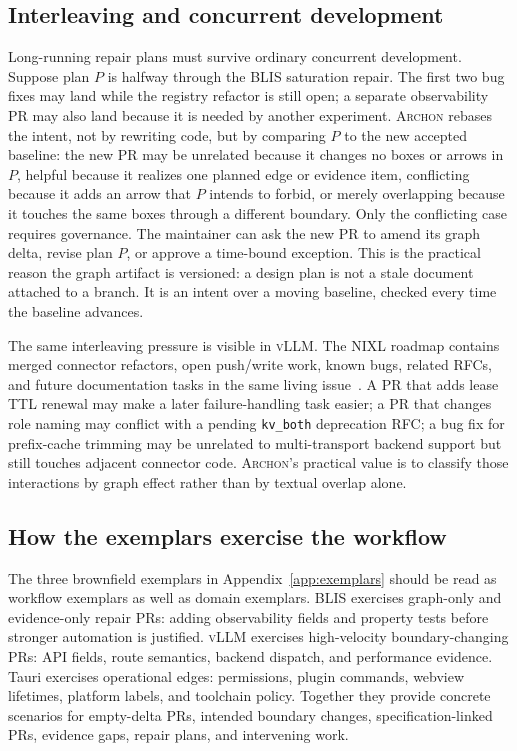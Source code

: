\documentclass[sigconf,review,anonymous]{acmart}
\theoremstyle{plain}
\theoremstyle{definition}
\begin{document}
\subsection{Interleaving and concurrent development}

Long-running repair plans must survive ordinary concurrent development. Suppose
plan $P$ is halfway through the BLIS saturation repair. The first two bug fixes
may land while the registry refactor is still open; a separate observability PR
may also land because it is needed by another experiment. \textsc{Archon} rebases
the intent, not by rewriting code, but by comparing $P$ to the new accepted
baseline:
the new PR may be unrelated because it changes no boxes or arrows in $P$,
helpful because it realizes one planned edge or evidence item, conflicting
because it adds an arrow that $P$ intends to forbid, or merely overlapping
because it touches the same boxes through a different boundary.
Only the conflicting case requires governance. The maintainer can ask the new PR
to amend its graph delta, revise plan $P$, or approve a time-bound exception.
This is the practical reason the graph artifact is versioned: a design plan is
not a stale document attached to a branch. It is an intent over a moving
baseline, checked every time the baseline advances.

The same interleaving pressure is visible in \textsc{vLLM}. The NIXL roadmap
contains merged connector refactors, open push/write work, known bugs, related
RFCs, and future documentation tasks in the same living issue~\cite{vllmnixlroadmap}.
A PR that adds lease TTL renewal may make a later failure-handling task easier;
a PR that changes role naming may conflict with a pending \texttt{kv\_both}
deprecation RFC; a bug fix for prefix-cache trimming may be unrelated to
multi-transport backend support but still touches adjacent connector code.
\textsc{Archon}'s practical value is to classify those interactions by graph
effect rather than by textual overlap alone.

\subsection{How the exemplars exercise the workflow}

The three brownfield exemplars in Appendix~\ref{app:exemplars} should be read as
workflow exemplars as well as domain exemplars. BLIS exercises graph-only and
evidence-only repair PRs: adding observability fields and property tests before
stronger automation is justified. \textsc{vLLM} exercises high-velocity
boundary-changing PRs: API fields, route semantics, backend dispatch, and
performance evidence. Tauri exercises operational edges: permissions, plugin
commands, webview lifetimes, platform labels, and toolchain policy. Together
they provide concrete scenarios for empty-delta PRs, intended boundary changes,
specification-linked PRs, evidence gaps, repair plans, and intervening work.
\end{document}
